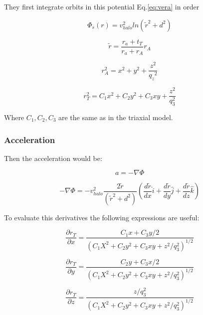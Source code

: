 They first integrate orbits in this potential Eq.\ref{eq:vera} in 
order  


\begin{equation}\label{ref:vera}
\Phi_s(r) = v_{halo}^2 ln(\tilde{r}^2 + d^2)
\end{equation}

\begin{equation}
\tilde{r} = \dfrac{r_a + t_T}{r_a + r_A}r_A
\end{equation}

\begin{equation}
r_A^2 = x^2 + y^2 + \dfrac{z^2}{{q_z}^2} 
\end{equation}

\begin{equation}
r_T ^ 2 = C_1 x^2 + C_2 y^2 + C_3 xy + \dfrac{z^2}{q_3^2}
\end{equation}

Where $C_1, C_2, C_3$ are the same as in the triaxial model. 

\subsubsection{Acceleration}

Then the acceleration would be:

\begin{equation}
a = -\nabla \Phi 
\end{equation}

\begin{equation}
-\nabla \Phi = -v_{halo}^2 \dfrac{2 \tilde{r} }{ (\tilde{r}^2 + d^2)} \left(  \dfrac{d\tilde{r}}{dx} \hat{i} + \dfrac{d\tilde{r}}{dy} \hat{j} + \dfrac{d\tilde{r}}{dz} \hat{k}    \right)
\end{equation}

To evaluate this derivatives the following expressions are useful:

\begin{equation}
\dfrac{\partial r_T}{\partial x} = \dfrac{C_1x + C_3y/2}{(C_1X^2 + C_2y^2 + C_3xy + z^2/q_3^2)^{1/2}}
\end{equation}

\begin{equation}
\dfrac{\partial r_T}{\partial y} = \dfrac{C_2y + C_3x/2}{(C_1X^2 + C_2y^2 + C_3xy + z^2/q_3^2)^{1/2}}
\end{equation}

\begin{equation}
\dfrac{\partial r_T}{\partial z} = \dfrac{z/q_3^2}{(C_1X^2 + C_2y^2 + C_3xy + z^2/q_3^2)^{1/2}}
\end{equation}

